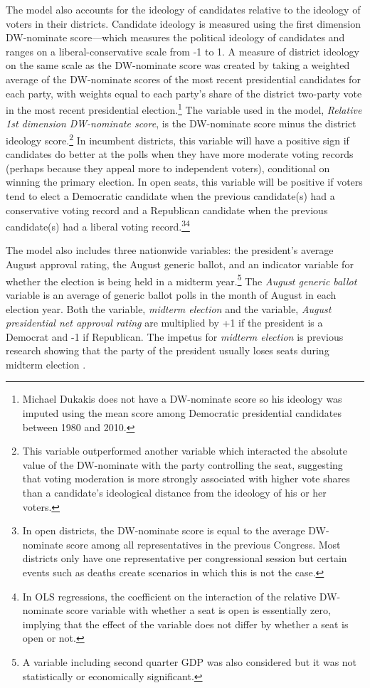 \documentclass[12pt,final,fleqn]{article}
\theoremstyle{plain}
\begin{document}
The model also accounts for the ideology of candidates relative to the ideology of voters in their districts. Candidate ideology is measured using the first dimension DW-nominate score---which measures the political ideology of candidates and ranges on a liberal-conservative scale from -1 to 1. A measure of district ideology on the same scale as the DW-nominate score was created by taking a weighted average of the DW-nominate scores of the most recent presidential candidates for each party, with weights equal to each party's share of the district two-party vote in the most recent presidential election.\footnote{Michael Dukakis does not have a DW-nominate score so his ideology was imputed using the mean score among Democratic presidential candidates between 1980 and 2010.} The variable used in the model, \emph{Relative 1st dimension DW-nominate score}, is the DW-nominate score minus the district ideology score.\footnote{This variable outperformed another variable which interacted the absolute value of the DW-nominate with the party controlling the seat, suggesting that voting moderation is more strongly associated with higher vote shares than a candidate's ideological distance from the ideology of his or her voters.} In incumbent districts, this variable will have a positive sign if candidates do better at the polls when they have more moderate voting records (perhaps because they appeal more to independent voters), conditional on winning the primary election. In open seats, this variable will be positive if voters tend to elect a Democratic candidate when the previous candidate(s) had a conservative voting record and a Republican candidate when the previous candidate(s) had a liberal voting record.\footnote{In open districts, the DW-nominate score is equal to the average DW-nominate score among all representatives in the previous Congress. Most districts only have one representative per congressional session but certain events such as deaths create scenarios in which this is not the case.}\footnote{In OLS regressions, the coefficient on the interaction of the relative DW-nominate score variable with whether a seat is open is essentially zero, implying that the effect of the variable does not differ by whether a seat is open or not.}

The model also includes three nationwide variables: the president's average August approval rating, the August generic ballot, and an indicator variable for whether the election is being held in a midterm year.\footnote{A variable including second quarter GDP was also considered but it was not statistically or economically significant.} The \emph{August generic ballot} variable is an average of generic ballot polls in the month of August in each election year. Both the variable, \emph{midterm election} and the variable, \emph{August presidential net approval rating} are multiplied by +1 if the president is a Democrat and -1 if Republican. The impetus for \emph{midterm election} is previous research showing that the party of the president usually loses seats during midterm election \citep[e.g.][]{erikson1988puzzle}. 
\end{document}

